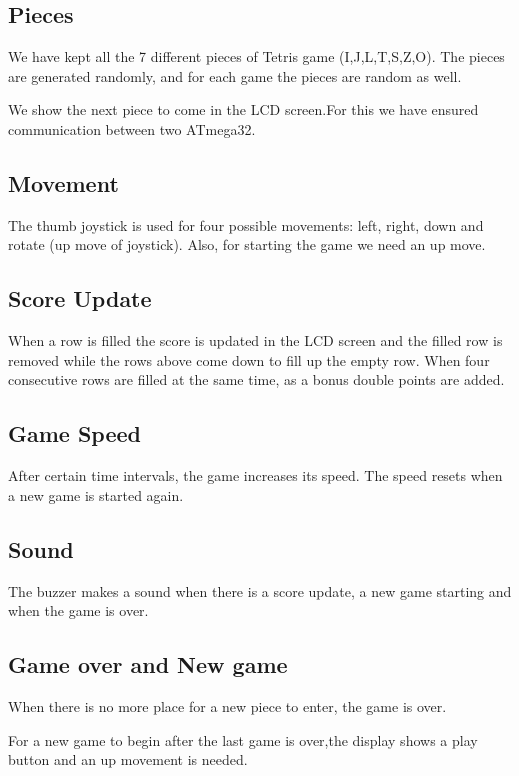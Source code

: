 \documentclass[12pt]{article}
\begin{document}
    \subsection{Pieces}
        We have kept all the 7 different pieces of Tetris game (I,J,L,T,S,Z,O). The pieces are generated randomly, and for each game the pieces are random as well.\vspace{1em}
        
        We show the next piece to come in the LCD screen.For this we have ensured communication between two ATmega32.
    
    \subsection{Movement}
        The thumb joystick is used for four possible movements: left, right, down and rotate (up move of joystick). Also, for starting the game we need an up move.

    \subsection{Score Update}
        When a row is filled the score is updated in the LCD screen and the filled row is removed while the rows above come down to fill up the empty row. When four consecutive rows are filled at the same time, as a bonus double points are added.
    
    \subsection{Game Speed}
        After certain time intervals, the game increases its speed. The speed resets when a new game is started again.
        
    \subsection{Sound}
        The buzzer makes a sound when there is a score update, a new game starting and when the game is over.

    \subsection{Game over and New game}
        When there is no more place for a new piece to enter, the game is over. 

        For a new game to begin after the last game is over,the display shows a play button and an up movement is needed.
        
\end{document}
